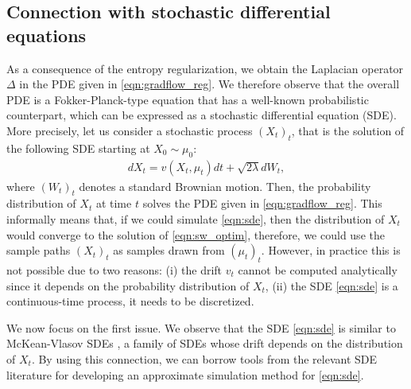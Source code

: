 \subsection{Connection with stochastic differential equations}

%
%
As a consequence of the entropy regularization, we obtain the Laplacian operator $\Delta$ in the PDE given in \eqref{eqn:gradflow_reg}. We therefore observe that the overall PDE is a Fokker-Planck-type equation \cite{bogachev2015fokker} that has a well-known probabilistic counterpart, which can be expressed as a stochastic differential equation (SDE). More precisely, let us consider a stochastic process $(X_t)_{t}$, that is the solution of the following SDE starting at $X_0 \sim \mu_0$:
\begin{align}
d X_t = v(X_t,\mu_t) dt + \sqrt{2 \lambda } d W_t, \label{eqn:sde}
\end{align}
where $(W_t)_t$ denotes a standard Brownian motion. Then, the probability distribution of $X_t$ at time $t$ solves the PDE given in \eqref{eqn:gradflow_reg}. This informally means that, if we could simulate \eqref{eqn:sde}, then the distribution of $X_t$ would converge to the solution of \eqref{eqn:sw_optim}, therefore, we could use the sample paths $(X_t)_t$ as samples drawn from $(\mu_t)_t$. However, in practice this is not possible due to two reasons: (i) the drift $v_t$ cannot be computed analytically since it depends on the probability distribution of $X_t$, (ii) the SDE \eqref{eqn:sde} is a continuous-time process, it needs to be discretized.








We now focus on the first issue.
%
We observe that the SDE \eqref{eqn:sde} is similar to McKean-Vlasov SDEs \cite{veretennikov2006ergodic,mishura2016existence}, a family of SDEs whose drift depends on the distribution of $X_t$. By using this connection, we can borrow tools from the relevant SDE literature \cite{malrieu03,cgm-08} for developing an approximate simulation method for \eqref{eqn:sde}.

